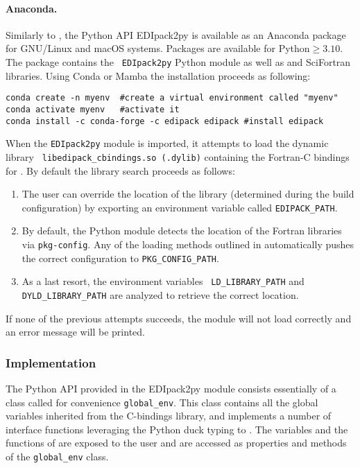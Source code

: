 \documentclass[edipack_sp.tex]{subfiles}
\begin{document}
\paragraph{Anaconda.}
Similarly to \NAME, the Python API EDIpack2py is available as an
Anaconda package for GNU/Linux and macOS systems. Packages are available for
Python$\geq 3.10$. The \NAME package contains the {\tt
  EDIpack2py} Python module as well as \NAME and SciFortran
libraries. 
Using Conda or Mamba the installation proceeds as following:
\begin{lstlisting}[style=mybash]
conda create -n myenv  #create a virtual environment called "myenv"
conda activate myenv   #activate it
conda install -c conda-forge -c edipack edipack #install edipack
\end{lstlisting}

\noindent
When the {\tt EDIpack2py}    module is imported, it attempts to load the dynamic library {\tt
  libedipack\-\_cbindings.so (.dylib)} containing the Fortran-C bindings
for \NAME. By default the library search proceeds as follows: 
\begin{enumerate}
\item The user can override the location of the library
  (determined during the \NAME build configuration) by exporting an
  environment variable called {\tt EDIPACK\_PATH}.
\item By default, the Python module detects the location of the
  Fortran libraries via {\tt pkg-config}. Any of the loading methods
  outlined in  automatically pushes the
  correct configuration to {\tt PKG\_CONFIG\_PATH}. 
\item As a last resort, the environment variables {\tt
    LD\_LIBRARY\_PATH} and {\tt DYLD\_LIBRARY\_PATH} are analyzed to
  retrieve the correct location. 
\end{enumerate}
If none of the previous attempts succeeds, the module will not load correctly and an error message will be printed. 



\subsubsection{Implementation}\label{sSecInteropEDIpyImplementation}
The Python API provided in the EDIpack2py module consists essentially of a
class called for convenience {\tt global\_env}.
This class contains all the global variables inherited from the \NAME
C-bindings library, and implements a number of interface functions
leveraging the Python duck typing to \NAME.  
The variables and the functions of \NAME are exposed to the user and
are accessed as properties and
methods of the {\tt global\_env} class.
\end{document}
